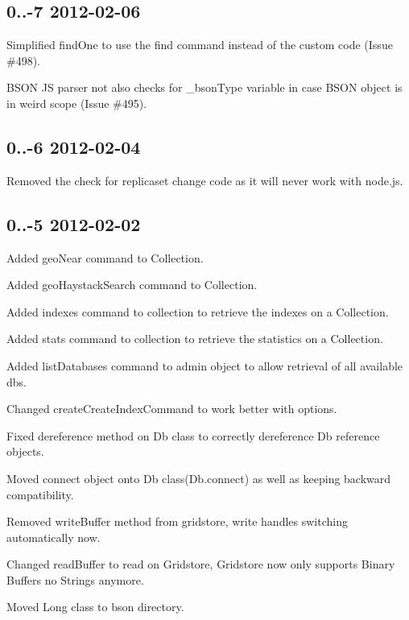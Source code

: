 \subsection*{0..-\/7 2012-\/02-\/06 }


\begin{DoxyItemize}
\item Simplified find\+One to use the find command instead of the custom code (Issue \#498).
\item B\+S\+ON JS parser not also checks for \+\_\+bson\+Type variable in case B\+S\+ON object is in weird scope (Issue \#495).
\end{DoxyItemize}

\subsection*{0..-\/6 2012-\/02-\/04 }


\begin{DoxyItemize}
\item Removed the check for replicaset change code as it will never work with node.\+js.
\end{DoxyItemize}

\subsection*{0..-\/5 2012-\/02-\/02 }


\begin{DoxyItemize}
\item Added geo\+Near command to Collection.
\item Added geo\+Haystack\+Search command to Collection.
\item Added indexes command to collection to retrieve the indexes on a Collection.
\item Added stats command to collection to retrieve the statistics on a Collection.
\item Added list\+Databases command to admin object to allow retrieval of all available dbs.
\item Changed create\+Create\+Index\+Command to work better with options.
\item Fixed dereference method on Db class to correctly dereference Db reference objects.
\item Moved connect object onto Db class(Db.\+connect) as well as keeping backward compatibility.
\item Removed write\+Buffer method from gridstore, write handles switching automatically now.
\item Changed read\+Buffer to read on Gridstore, Gridstore now only supports Binary Buffers no Strings anymore.
\item Moved Long class to bson directory.
\end{DoxyItemize}

